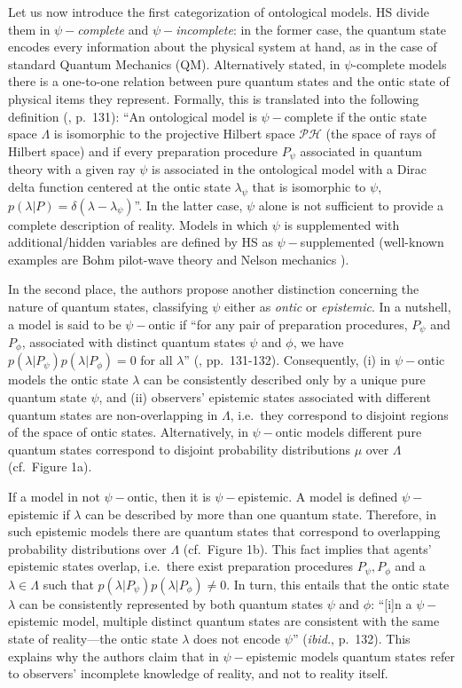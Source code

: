 \documentclass[twocolumn,prl,floatfix,superscriptaddress]{revtex4-2}
\begin{document}
Let us now introduce the first categorization of ontological models. HS divide them in $\psi-$\emph{complete} and $\psi-$\emph{incomplete}: in the former case, the quantum state encodes every information about the physical system at hand, as in the case of standard Quantum Mechanics (QM). Alternatively stated, in $\psi$-complete models there is a one-to-one relation between pure quantum states and the ontic state of physical items they represent. Formally, this is translated into the following definition (\cite{Harrigan:2010}, p.\ 131): ``An ontological model is $\psi-$complete if the ontic state space $\Lambda$ is isomorphic to the projective Hilbert space $\mathcal{PH}$ (the space of rays of Hilbert space) and if every preparation procedure $P_{\psi}$ associated in quantum theory with a given ray $\psi$ is associated in the ontological model with a Dirac delta function centered at the ontic
state $\lambda_{\psi}$ that is isomorphic to $\psi$, $p(\lambda|P)=\delta(\lambda-\lambda_{\psi})$''.
In the latter case, $\psi$ alone is not sufficient to provide a complete description of reality. Models in which $\psi$ is supplemented with additional/hidden variables are defined by HS as $\psi-$supplemented (well-known examples are Bohm pilot-wave theory \cite{Bohm:1952aa} and Nelson mechanics \cite{Nelson:1966aa}). 

In the second place, the authors propose another distinction concerning the nature of quantum states, classifying $\psi$ either as \emph{ontic} or \emph{epistemic}. In a nutshell, a model is said to be $\psi-$ontic if ``for any pair of preparation procedures, $P_{\psi}$ and $P_{\phi}$, associated with distinct quantum states $\psi$ and $\phi$, we have $p(\lambda | P_{\psi})p(\lambda|P_{\phi})=0$ for all $\lambda$'' (\cite{Harrigan:2010}, pp.\ 131-132). Consequently, (i) in $\psi-$ontic models the ontic state $\lambda$ can be consistently described only by a unique pure quantum state $\psi$, and (ii) observers' epistemic states associated with different quantum states are non-overlapping in $\Lambda$, i.e.\ they correspond to disjoint regions of the space of ontic states. Alternatively, in $\psi-$ontic models different pure quantum states correspond to disjoint probability distributions $\mu$ over $\Lambda$ (cf.\ Figure 1a). 

If a model in not $\psi-$ontic, then it is $\psi-$epistemic. A model is defined $\psi-$epistemic if $\lambda$ can be described by more than one quantum state. Therefore, in such epistemic models there are quantum states that correspond to overlapping probability distributions over $\Lambda$ (cf.\ Figure 1b).
This fact implies that agents' epistemic states overlap, i.e.\ there exist preparation procedures $P_{\psi}, P_{\phi}$ and a $\lambda\in\Lambda$ such that $p(\lambda | P_{\psi})p(\lambda|P_{\phi})\neq0$. In turn, this entails that the ontic state $\lambda$ can be consistently represented by both quantum states $\psi$ and $\phi$: ``[i]n a $\psi-$epistemic model, multiple distinct quantum states are consistent with the same state of reality---the ontic state $\lambda$ does not encode $\psi$'' (\emph{ibid.}, p.\ 132). This explains why the authors claim that in $\psi-$epistemic models quantum states refer to observers' incomplete knowledge of reality, and not to reality itself.
\end{document}
